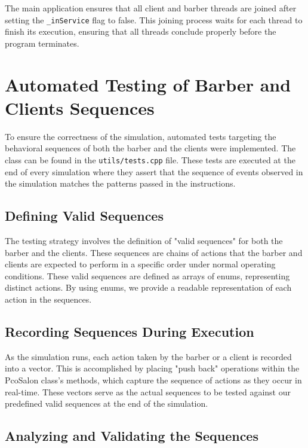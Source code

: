 \documentclass{article}
\begin{document}
    The main application ensures that all client and barber threads are joined after setting the \texttt{\_inService} flag to false.
    This joining process waits for each thread to finish its execution, ensuring that all threads conclude properly before the program terminates.

    \section{Automated Testing of Barber and Clients Sequences}

    To ensure the correctness of the simulation,  automated tests targeting the behavioral sequences of both the barber and the clients were implemented.
    The class can be found in the \texttt{utils/tests.cpp} file.
    These tests are executed at the end of every simulation where they assert that the sequence of events observed in the simulation matches the patterns passed in the instructions.

    \subsection{Defining Valid Sequences}

    The testing strategy involves the definition of "valid sequences" for both the barber and the clients.
    These sequences are chains of actions that the barber and clients are expected to perform in a specific order under normal operating conditions.
    These valid sequences are defined as arrays of enums, representing distinct actions.
    By using enums, we provide a readable representation of each action in the sequences.

    \subsection{Recording Sequences During Execution}

    As the simulation runs, each action taken by the barber or a client is recorded into a vector.
    This is accomplished by placing "push back" operations within the PcoSalon class's methods, which capture the sequence of actions as they occur in real-time.
    These vectors serve as the actual sequences to be tested against our predefined valid sequences at the end of the simulation.

    \subsection{Analyzing and Validating the Sequences}
\end{document}
